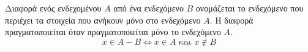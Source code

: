 Διαφορά ενός ενδεχομένου $ A $ από ένα ενδεχόμενο $ B $ ονομάζεται το ενδεχόμενο που περιέχει τα στοιχεία που ανήκουν μόνο στο ενδεχόμενο $ A $. Η διαφορά πραγματοποιείται όταν πραγματοποιείται μόνο το ενδεχόμενο $ A $. \[ x\in A-B\Leftrightarrow x\in A \textrm{ και }x\notin B \]
